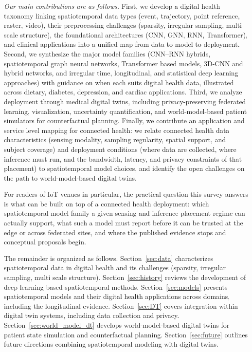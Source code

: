 \documentclass[journal]{IEEEtran}
\begin{document}
\emph{Our main contributions are as follows.} First, we develop a digital health taxonomy linking spatiotemporal data types (event, trajectory, point reference, raster, video), their preprocessing challenges (sparsity, irregular sampling, multi scale structure), the foundational architectures (CNN, GNN, RNN, Transformer), and clinical applications into a unified map from data to model to deployment. Second, we synthesize the major model families (CNN--RNN hybrids, spatiotemporal graph neural networks, Transformer based models, 3D-CNN and hybrid networks, and irregular time, longitudinal, and statistical deep learning approaches) with guidance on when each suits digital health data, illustrated across dietary, diabetes, depression, and cardiac applications. Third, we analyze deployment through medical digital twins, including privacy-preserving federated learning, visualization, uncertainty quantification, and world-model-based patient simulators for counterfactual planning. Finally, we contribute an application and service level mapping for connected health: we relate connected health data characteristics (sensing modality, sampling regularity, spatial support, and subject coverage) and deployment conditions (where data are collected, where inference must run, and the bandwidth, latency, and privacy constraints of that placement) to spatiotemporal model choices, and identify the open challenges on the path to world-model-based digital twins.



For readers of IoT venues in particular, the practical question this survey answers is what can be built on top of a connected health deployment: which spatiotemporal model family a given sensing and inference placement regime can actually support, what such a model must report before it can be trusted at the edge or across federated sites, and where the published evidence stops and conceptual proposals begin.

The remainder is organized as follows. Section~\ref{sec:data} characterizes spatiotemporal data in digital health and its challenges (sparsity, irregular sampling, multi scale structure). Section~\ref{sec:history} reviews the development of deep learning based spatiotemporal methods. Section~\ref{sec:models} presents spatiotemporal models and their digital health applications across domains, including the longitudinal evidence. Section~\ref{sec:DT} covers integration within digital twin systems, including data collection and privacy. Section~\ref{sec:world_model_dt} develops world-model-based digital twins for patient state simulation and counterfactual planning. Section~\ref{sec:future} outlines future directions combining spatiotemporal modeling with digital twins.
\end{document}
